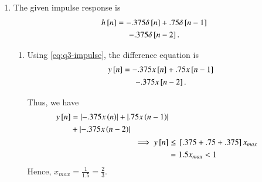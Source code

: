\documentclass[journal,12pt,twocolumn]{IEEEtran}
\begin{document}
\begin{enumerate}
    \item The given impulse response is
    \begin{multline}
        h{}\left[n\right] = -.375\delta{}\left[n\right] + .75\delta{}\left[n-1\right] \\
        - .375\delta{}\left[n-2\right].
        \label{eq:q3-impulse}
    \end{multline}
    \begin{enumerate}
        \item Using \eqref{eq:q3-impulse}, the difference equation is
        \begin{multline}
            y{}\left[n\right] = -.375x{}\left[n\right] + .75x{}\left[n-1\right] \\ 
            - .375x{}\left[n-2\right].
            \label{eq:q3-diff-eqn}
        \end{multline}

        Thus, we have
        \begin{align}
            \begin{split}
                y{}\left[n\right] &= \left\vert-.375x\left(n\right)\right\vert + \left\vert.75x\left(n-1\right)\right\vert \\
                &+ \left\vert-.375x\left(n-2\right)\right\vert
            \end{split} \\
            \implies y{}\left[n\right] &\le {}\left[.375 + .75 + .375\right]x_{max} \\
                                &= 1.5x_{max} < 1 \\
        \end{align}
        Hence, \(x_{max} = \frac{1}{1.5} = \frac{2}{3}\).


\end{enumerate}
\end{enumerate}
\end{document}
